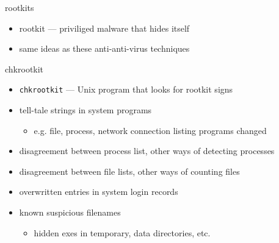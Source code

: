 \begin{frame}{rootkits}
    \begin{itemize}
    \item rootkit --- priviliged malware that hides itself
    \item same ideas as these anti-anti-virus techniques
    \end{itemize}
\end{frame}

\begin{frame}{chkrootkit}
    \begin{itemize}
    \item \texttt{chkrootkit} --- Unix program that looks for rootkit signs
    \vspace{.5cm}
    \item tell-tale strings in system programs
        \begin{itemize}
        \item e.g. file, process, network connection listing programs changed
        \end{itemize}
    \item disagreement between process list, other ways of detecting processes
    \item disagreement between file lists, other ways of counting files
    \item overwritten entries in system login records
    \item known suspicious filenames
        \begin{itemize}
        \item hidden exes in temporary, data directories, etc.
        \end{itemize}
    \end{itemize}
\end{frame}
